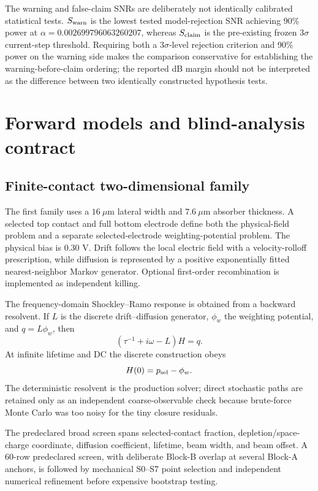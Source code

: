 \documentclass[11pt]{article}
\begin{document}
The warning and false-claim SNRs are deliberately not identically calibrated statistical tests. $S_{\rm warn}$ is the lowest tested model-rejection SNR achieving 90\% power at $\alpha=0.002699796063260207$, whereas $S_{\rm claim}$ is the pre-existing frozen $3\sigma$ current-step threshold. Requiring both a $3\sigma$-level rejection criterion and 90\% power on the warning side makes the comparison conservative for establishing the warning-before-claim ordering; the reported dB margin should not be interpreted as the difference between two identically constructed hypothesis tests.

\section{Forward models and blind-analysis contract}

\subsection{Finite-contact two-dimensional family}

The first family uses a $16~\mu\mathrm{m}$ lateral width and $7.6~\mu\mathrm{m}$ absorber thickness. A selected top contact and full bottom electrode define both the physical-field problem and a separate selected-electrode weighting-potential problem. The physical bias is 0.30 V. Drift follows the local electric field with a velocity-rolloff prescription, while diffusion is represented by a positive exponentially fitted nearest-neighbor Markov generator. Optional first-order recombination is implemented as independent killing.

The frequency-domain Shockley--Ramo response is obtained from a backward resolvent. If $L$ is the discrete drift--diffusion generator, $\phi_w$ the weighting potential, and $q=L\phi_w$, then
\begin{equation}
(\tau^{-1}+i\omega-L)H=q.
\label{eq:resolvent}
\end{equation}
At infinite lifetime and DC the discrete construction obeys
\begin{equation}
H(0)=p_{\rm sel}-\phi_w.
\label{eq:ramoid}
\end{equation}
The deterministic resolvent is the production solver; direct stochastic paths are retained only as an independent coarse-observable check because brute-force Monte Carlo was too noisy for the tiny closure residuals.

The predeclared broad screen spans selected-contact fraction, depletion/space-charge coordinate, diffusion coefficient, lifetime, beam width, and beam offset. A 60-row predeclared screen, with deliberate Block-B overlap at several Block-A anchors, is followed by mechanical S0--S7 point selection and independent numerical refinement before expensive bootstrap testing.
\end{document}
